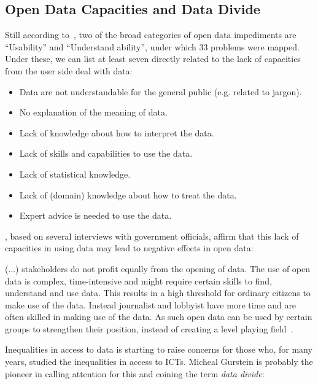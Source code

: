 \subsection{Open Data Capacities and Data Divide}
\label{sec:datadivide}

Still according to~, two of the broad categories of open data impediments are ``Usability'' and ``Understand ability'', under which 33 problems were mapped.
Under these, we can list at least seven directly related to the lack of capacities from the user side deal with data:

\begin{itemize}
	\item Data are not understandable for the general public (e.g. related to jargon). 
	\item No explanation of the meaning of data. 
	\item Lack of knowledge about how to interpret the data. 
	\item Lack of skills and capabilities to use the data. 
	\item Lack of statistical knowledge.
	\item Lack of (domain) knowledge about how to treat the data. 
	\item Expert advice is needed to use the data.
\end{itemize}

, based on several interviews with government officials, affirm that this lack of capacities in using data may lead to negative effects in open data: 

\begin{citacao}
(...) stakeholders do not profit equally from the opening of data. The use of open data is complex, time-intensive and might require certain skills to find, understand and use data. This results in a high threshold for ordinary citizens to make use of the data. Instead journalist and lobbyist have more time and are often skilled in making use of the data. As such open data can be used by certain groups to strengthen their position, instead of creating a level playing field~\cite[p.150]{Zuiderwijk2014a}.
\end{citacao}

Inequalities in access to data is starting to raise concerns for those who, for many years, studied the inequalities in access to ICTs.
Micheal Gurstein is probably the pioneer in calling attention for this and coining the term \emph{data divide}: 

